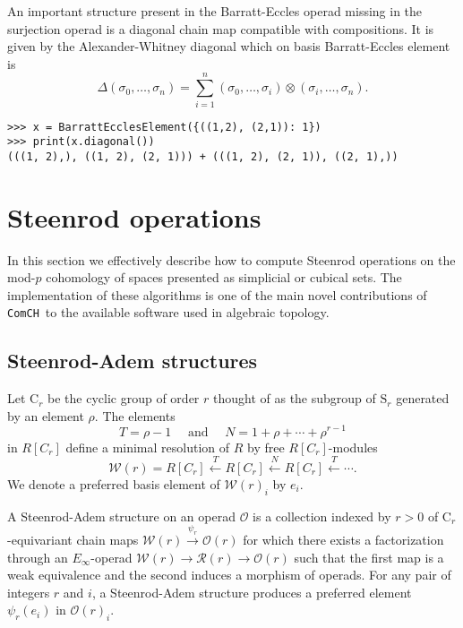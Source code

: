 \documentclass{amsart}
\newcommand{\comch}{\texttt{ComCH}}
\begin{document}
An important structure present in the Barratt-Eccles operad missing in the surjection operad is a diagonal chain map compatible with compositions. It is given by the Alexander-Whitney diagonal which on basis Barratt-Eccles element is
\begin{equation*}
\Delta(\sigma_0, \dots, \sigma_n) = \sum_{i=1}^n (\sigma_0, \dots, \sigma_i) \otimes (\sigma_i, \dots, \sigma_n).
\end{equation*}
\begin{Verbatim}[frame=single]
>>> x = BarrattEcclesElement({((1,2), (2,1)): 1})
>>> print(x.diagonal())
(((1, 2),), ((1, 2), (2, 1))) + (((1, 2), (2, 1)), ((2, 1),))
\end{Verbatim}

\section{Steenrod operations} \label{s: steenrod operations}

In this section we effectively describe how to compute Steenrod operations on the mod-$p$ cohomology of spaces presented as simplicial or cubical sets. The implementation of these algorithms is one of the main novel contributions of \comch\, to the available software used in algebraic topology.

\subsection{Steenrod-Adem structures}

Let $\mathrm{C}_r$ be the cyclic group of order $r$ thought of as the subgroup of $\mathrm{S}_r$ generated by an element $\rho$. The elements
\begin{equation*}
T = \rho-1 \quad \text{ and } \quad N = 1+\rho+\cdots+\rho^{r-1}
\end{equation*}
in $R[C_r]$ define a minimal resolution of $R$ by free $R[C_r]$-modules
\begin{equation*}
\mathcal W(r) = R[C_r] \stackrel{T}{\longleftarrow} R[C_r] \stackrel{N}{\longleftarrow} R[C_r] \stackrel{T}{\longleftarrow} \cdots.
\end{equation*}
We denote
a preferred basis element of $\mathcal W(r)_i$ by $e_i$.

A Steenrod-Adem structure on an operad $\mathcal O$ is a collection indexed by $r > 0$ of $\mathrm C_r$-equivariant chain maps $\mathcal W(r) \stackrel{\psi_r}{\longrightarrow} \mathcal O(r)$ for which there exists a factorization through an $E_\infty$-operad $\mathcal W(r) \to \mathcal R(r) \to \mathcal O(r)$ such that the first map is a weak equivalence and the second induces a morphism of operads.
For any pair of integers $r$ and $i$, a Steenrod-Adem structure produces a preferred element $\psi_r(e_i)$ in $\mathcal O(r)_i$.
\end{document}

